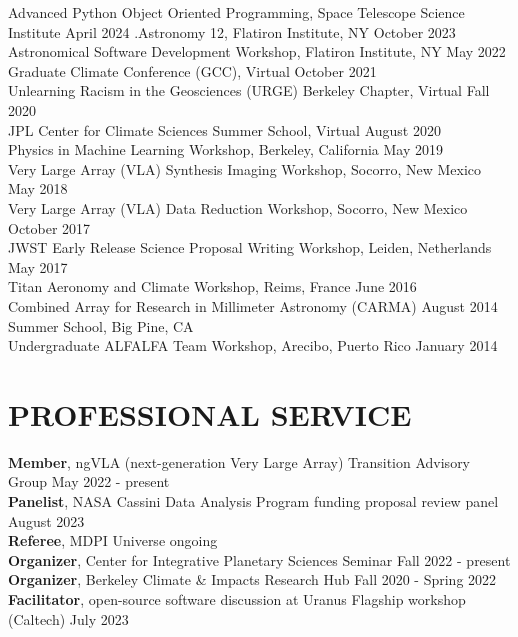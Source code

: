 \documentclass[margin, 10pt]{res} %
\newcommand\tab[1][1cm]{\hspace*{#1}}
\begin{document}
\begin{resume}
Advanced Python Object Oriented Programming, Space Telescope Science Institute \hfill April 2024
.Astronomy 12, Flatiron Institute, NY \hfill October 2023 \\
Astronomical Software Development Workshop, Flatiron Institute, NY \hfill May 2022 \\ 
Graduate Climate Conference (GCC), Virtual \hfill October 2021 \\ 
Unlearning Racism in the Geosciences (URGE) Berkeley Chapter, Virtual \hfill Fall 2020 \\ 
JPL Center for Climate Sciences Summer School, Virtual \hfill August 2020 \\ 
Physics in Machine Learning Workshop, Berkeley, California \hfill May 2019 \\
Very Large Array (VLA) Synthesis Imaging Workshop, Socorro, New Mexico \hfill May 2018 \\
Very Large Array (VLA) Data Reduction Workshop, Socorro, New Mexico \hfill October 2017 \\
JWST Early Release Science Proposal Writing Workshop, Leiden, Netherlands \hfill May 2017 \\
Titan Aeronomy and Climate Workshop, Reims, France \hfill June 2016 \\
Combined Array for Research in Millimeter Astronomy (CARMA) \hfill August 2014 \\
  \tab Summer School, Big Pine, CA  \\
Undergraduate ALFALFA Team Workshop, Arecibo, Puerto Rico \hfill January 2014


\section{PROFESSIONAL SERVICE}

{\bf Member}, ngVLA (next-generation Very Large Array) Transition Advisory Group \hfill May 2022 - present \\
{\bf Panelist}, NASA Cassini Data Analysis Program funding proposal review panel \hfill August 2023 \\
{\bf Referee}, MDPI Universe \hfill ongoing \\
{\bf Organizer}, Center for Integrative Planetary Sciences Seminar \hfill Fall 2022 - present \\
{\bf Organizer}, Berkeley Climate \& Impacts Research Hub \hfill Fall 2020 - Spring 2022 \\
{\bf Facilitator}, open-source software discussion at Uranus Flagship workshop (Caltech) \hfill July 2023 \\



\end{resume}
\end{document}
